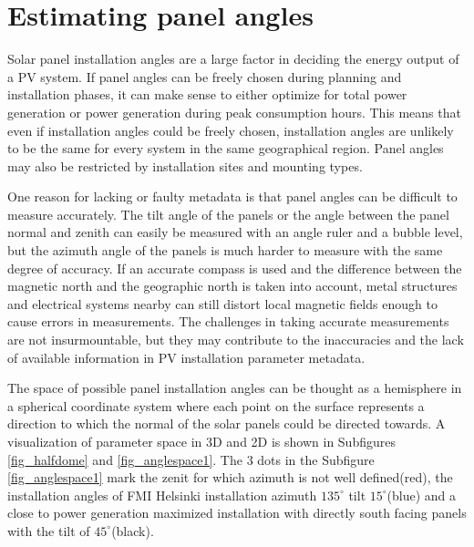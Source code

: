 \chapter{Estimating panel angles}
Solar panel installation angles are a large factor in deciding the energy output of a PV system. If panel angles can be freely chosen during planning and installation phases, it can make sense to either optimize for total power generation or power generation during peak consumption hours. This means that even if installation angles could be freely chosen, installation angles are unlikely to be the same for every system in the same geographical region. Panel angles may also be restricted by installation sites and mounting types. 


One reason for lacking or faulty metadata is that panel angles can be difficult to measure accurately. The tilt angle of the panels or the angle between the panel normal and zenith can easily be measured with an angle ruler and a bubble level, but the azimuth angle of the panels is much harder to measure with the same degree of accuracy. If an accurate compass is used and the difference between the magnetic north and the geographic north is taken into account, metal structures and electrical systems nearby can still distort local magnetic fields enough to cause errors in measurements. The challenges in taking accurate measurements are not insurmountable, but they may contribute to the inaccuracies and the lack of available information in PV installation parameter metadata. 

The space of possible panel installation angles can be thought as a hemisphere in a spherical coordinate system where each point on the surface represents a direction to which the normal of the solar panels could be directed towards. A visualization of parameter space in 3D and 2D is shown in Subfigures \ref{fig_halfdome} and \ref{fig_anglespace1}. The 3 dots in the Subfigure \ref{fig_anglespace1} mark the zenit for which azimuth is not well defined(red), the installation angles of FMI Helsinki installation azimuth $135^\circ$ tilt $15^\circ$(blue) and a close to power generation maximized installation with directly south facing panels with the tilt of $45^\circ$(black).


